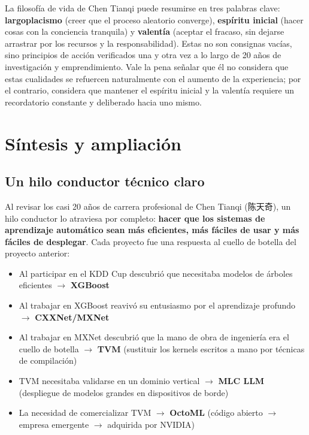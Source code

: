 \documentclass[a4paper]{article}
\begin{document}
La filosofía de vida de Chen Tianqi puede resumirse en tres palabras clave: \textbf{largoplacismo} (creer que el proceso aleatorio converge), \textbf{espíritu inicial} (hacer cosas con la conciencia tranquila) y \textbf{valentía} (aceptar el fracaso, sin dejarse arrastrar por los recursos y la responsabilidad). Estas no son consignas vacías, sino principios de acción verificados una y otra vez a lo largo de 20 años de investigación y emprendimiento. Vale la pena señalar que él no considera que estas cualidades se refuercen naturalmente con el aumento de la experiencia; por el contrario, considera que mantener el espíritu inicial y la valentía requiere un recordatorio constante y deliberado hacia uno mismo.
\section{Síntesis y ampliación}

\subsection{Un hilo conductor técnico claro}

Al revisar los casi 20 años de carrera profesional de Chen Tianqi (陈天奇), un hilo conductor lo atraviesa por completo: \textbf{hacer que los sistemas de aprendizaje automático sean más eficientes, más fáciles de usar y más fáciles de desplegar}. Cada proyecto fue una respuesta al cuello de botella del proyecto anterior:

\begin{itemize}
    \item Al participar en el KDD Cup descubrió que necesitaba modelos de árboles eficientes $\rightarrow$ \textbf{XGBoost}
    \item Al trabajar en XGBoost reavivó su entusiasmo por el aprendizaje profundo $\rightarrow$ \textbf{CXXNet/MXNet}
    \item Al trabajar en MXNet descubrió que la mano de obra de ingeniería era el cuello de botella $\rightarrow$ \textbf{TVM} (sustituir los kernels escritos a mano por técnicas de compilación)
    \item TVM necesitaba validarse en un dominio vertical $\rightarrow$ \textbf{MLC LLM} (despliegue de modelos grandes en dispositivos de borde)
    \item La necesidad de comercializar TVM $\rightarrow$ \textbf{OctoML} (código abierto $\rightarrow$ empresa emergente $\rightarrow$ adquirida por NVIDIA)
\end{itemize}
\end{document}
